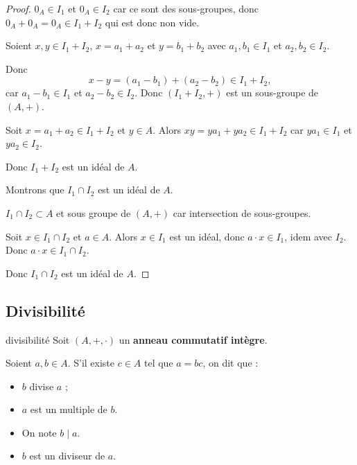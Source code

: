 \begin{proof}
    $0_A \in I_1$ et $0_A \in I_2$ car ce sont des sous-groupes, donc $0_A  + 0_A = 0_A \in I_1 + I_2$
    qui est donc non vide.

    Soient $x, y \in I_1 + I_2$, $x = a_1 + a_2$ et $y = b_1 + b_2$ avec $a_1, b_1 \in I_1$ et $a_2, b_2 \in I_2$.

    Donc \[
        x - y = (a_1 - b_1) + (a_2 - b_2) \in I_1 + I_2,
    \]
    car $a_1 - b_1 \in I_1$ et $a_2 - b_2 \in I_2$.
    Donc $(I_1 + I_2, +)$ est un sous-groupe de $(A, +)$.

    Soit $x = a_1 + a_2 \in I_1 + I_2$ et $y \in A$. Alors 
    $xy = y a_1 + y a_2 \in I_1 + I_2$ car $y a_1 \in I_1$ et $y a_2 \in I_2$.

    Donc $I_1 + I_2$ est un idéal de $A$.

    \svspace Montrons que $I_1 \cap I_2$ est un idéal de $A$.

    $I_1 \cap I_2 \subset A$ et sous groupe de $(A, +)$ car intersection de sous-groupes.

    Soit $x \in I_1 \cap I_2$ et $a \in A$. Alors $x \in I_1$ est un idéal, donc $a \cdot x \in I_1$, 
    idem avec $I_2$. Donc $a \cdot x \in I_1 \cap I_2$.

    Donc $I_1 \cap I_2$ est un idéal de $A$.
\end{proof}

\subsection{Divisibilité}


\lvspace \avspace \begin{definition}{divisibilité}{}
    Soit $(A, +, \cdot)$ un \textbf{anneau commutatif intègre}. 

    Soient $a, b \in A$. S'il existe $c \in A$ tel que $a = bc$, on dit que : 
    \begin{itemize}
        \item $b$ divise $a$ ;
        \item $a$ est un multiple de $b$.
        \item On note $b \mid a$.
        \item $b$ est un diviseur de $a$.
    \end{itemize}
\end{definition}

